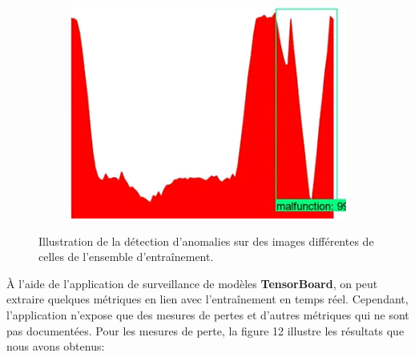 \documentclass[french]{article}
\theoremstyle{mytheoremstyle}
\theoremstyle{mytheoremstyle}
\theoremstyle{myproblemstyle}
\begin{document}
\begin{figure}[H]
\begin{subfigure}[t]{0.3\textwidth}
            \includegraphics[width=1\textwidth]{images/od_3.png}
    \end{subfigure}
    \caption{Illustration de la détection d'anomalies sur des images différentes de celles de l'ensemble d'entraînement.}
    \end{figure}

    À l'aide de l'application de surveillance de modèles \textbf{TensorBoard}, on peut extraire quelques métriques en lien avec l'entraînement en temps réel. Cependant, l'application n'expose que des mesures de pertes et d'autres métriques qui ne sont pas documentées. Pour les mesures de perte, la figure 12 illustre les résultats que nous avons obtenus:
    
\end{document}

